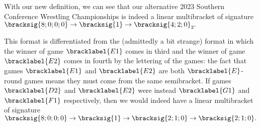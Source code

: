 {    With our new definition, we can see that our alternative 2023 Southern Conference Wrestling Championships is indeed a linear multibracket of signature $\bracksig{8;0;0;0} \to \bracksig{1} \to \bracksig{4;2;0}_2.$


    This format is differentiated from the (admittedly a bit strange) format in which the winner of game $\bracklabel{E1}$ comes in third and the winner of game $\bracklabel{E2}$ comes in fourth by the lettering of the games: the fact that games $\bracklabel{E1}$ and $\bracklabel{E2}$ are both $\bracklabel{E}$-round games means they must come from the same semibracket. If games $\bracklabel{D2}$ and $\bracklabel{E2}$ were instead $\bracklabel{G1}$ and $\bracklabel{F1}$ respectively, then we would indeed have a linear multibracket of signature $\bracksig{8;0;0;0} \to \bracksig{1} \to \bracksig{2;1;0} \to \bracksig{2;1;0}.$





    
    
    























}




